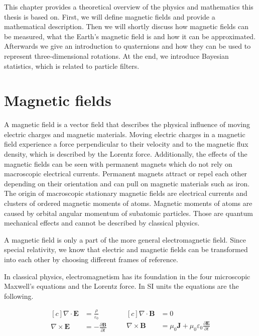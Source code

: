 This chapter provides a theoretical overview of the physics and mathematics this thesis is based on. First, we will define magnetic fields and provide a mathematical description. Then we will shortly discuss how magnetic fields can be measured, what the Earth's magnetic field is and how it can be approximated. Afterwards we give an introduction to quaternions and how they can be used to represent three-dimensional rotations. At the end, we introduce Bayesian statistics, which is related to particle filters.

\section{Magnetic fields}

A magnetic field is a vector field that describes the physical influence of moving electric charges and magnetic materials. Moving electric charges in a magnetic field experience a force perpendicular to their velocity and to the magnetic flux density, which is described by the Lorentz force. Additionally, the effects of the magnetic fields can be seen with permanent magnets which do not rely on macroscopic electrical currents. Permanent magnets attract or repel each other depending on their orientation and can pull on magnetic materials such as iron. The origin of macroscopic stationary magnetic fields are electrical currents and clusters of ordered magnetic moments of atoms. Magnetic moments of atoms are caused by orbital angular momentum of subatomic particles. Those are quantum mechanical effects and cannot be described by classical physics.

A magnetic field is only a part of the more general electromagnetic field. Since special relativity, we know that electric and magnetic fields can be transformed into each other by choosing different frames of reference.

In classical physics, electromagnetism has its foundation in the four microscopic Maxwell's equations and the Lorentz force. In SI units the equations are the following.\cite{demtroeder_mw}

\begin{equation}
\label{eq:maxwell_micro}
    \begin{aligned}[c]
        \nabla \cdot \bm{E} &= \frac{\rho}{\varepsilon_0}\\
        \nabla \times \bm{E} &= -\frac{\partial \bm{B}}{\partial t}\\
    \end{aligned}
    \qquad
    \begin{aligned}[c]
        \nabla \cdot \bm{B} &= 0\\
        \nabla \times \bm{B} &= \mu_0 \bm{J} + \mu_0 \varepsilon_0 \frac{\partial \bm{E}}{\partial t}\\
    \end{aligned}
\end{equation}

